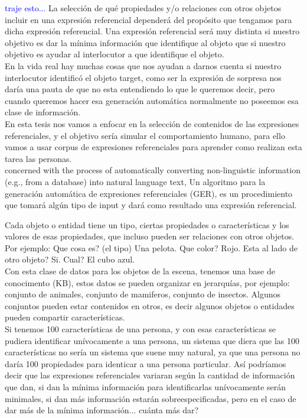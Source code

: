 \textcolor{blue}{traje esto...}
La selecci\'on de qu\'e propiedades y/o relaciones con otros objetos incluir en una expresi\'on referencial depender\'a del prop\'osito que tengamos para dicha expresi\'on referencial. Una expresi\'on referencial ser\'a muy distinta si nuestro objetivo es dar la m\'inima informaci\'on que identifique al objeto que si nuestro objetivo es ayudar al interlocutor a que identifique el objeto.\\

En la vida real hay muchas cosas que nos ayudan a darnos cuenta si nuestro interlocutor identific\'o el objeto target, como ser la expresi\'on de sorpresa nos dar\'ia una pauta de que no esta entendiendo lo que le queremos decir, pero cuando queremos hacer esa generaci\'on autom\'atica normalmente no poseemos esa clase de informaci\'on.\\

En esta tesis nos vamos a enfocar en la selecci\'on de contenidos de las expresiones referenciales, y el objetivo ser\'ia simular el comportamiento humano, para ello vamos a usar corpus de expresiones referenciales para aprender como realizan esta tarea las personas.\\

concerned with the process of automatically converting non-linguistic information (e.g.,
from a database) into natural language text, 
Un algoritmo para la generaci\'on autom\'atica de expresiones referenciales (GER), es un procedimiento que tomar\'a alg\'un tipo de input y dar\'a como resultado una expresi\'on referencial.


Cada objeto o entidad tiene un tipo, ciertas propiedades o caracter\'isticas y los valores de esas propiedades, que incluso pueden ser relaciones con otros objetos. \\

Por ejemplo: Que cosa es? (el tipo) Una pelota. Que color? Rojo. Esta al lado de otro objeto? Si. Cual? El cubo azul.\\

Con esta clase de datos para los objetos de la escena, tenemos una base de conocimento (KB), estos datos se pueden organizar en jerarqu\'ias, por ejemplo: conjunto de animales, conjunto de mamiferos, conjunto de insectos. Algunos conjuntos pueden estar contenidos en otros, es decir algunos objetos o entidades pueden compartir caracter\'isticas.\\

Si tenemos 100 caracter\'isticas de una persona, y con esas caracter\'isticas se pudiera identificar un\'ivocamente a una persona, un sistema que diera que las 100 caracter\'isticas no ser\'ia un sistema que suene muy natural, ya que una persona no dar\'ia 100 propiedades para identicar a una persona particular. As\'i podr\'iamos decir que las expresiones referenciales variaran seg\'un la cantidad de informaci\'on que dan, si dan la m\'inima informaci\'on para identificarlas un\'ivocamente ser\'an minimales, si dan m\'as informaci\'on estar\'an sobreespecificadas, pero en el caso de dar m\'as de la m\'inima informaci\'on... cu\'anta m\'as dar?

